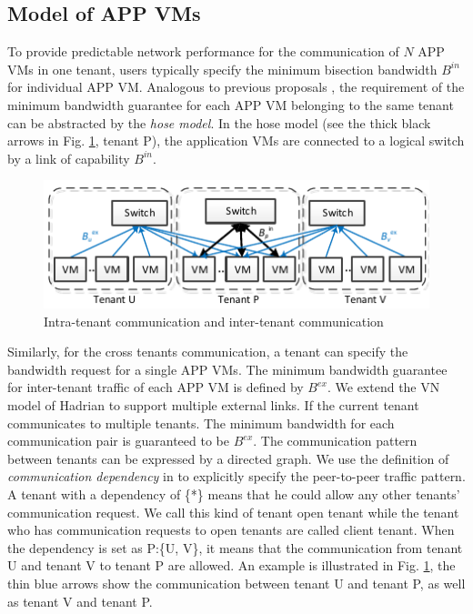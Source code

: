 \documentclass[10pt, conference, letterpaper]{IEEEtran}
\begin{document}
\subsection{Model of APP VMs}
To provide predictable network performance for the communication of $N$ APP VMs in one tenant, users typically specify the minimum bisection bandwidth $B^{in}$ for individual APP VM. Analogous to previous proposals \cite{B13cta, P12fst}, the requirement of the minimum bandwidth guarantee for each APP VM belonging to the same tenant can be abstracted by the \emph{hose model}. In the hose model (see the thick black arrows in Fig. \ref{fig:hose}, tenant P), the application VMs are connected to a logical switch by a link of capability $B^{in}$.

\begin{figure}
	\centering
		\includegraphics[width=3.5 in]{fig/tagmodel.pdf}
	\caption{Intra-tenant communication and inter-tenant communication}
	\label{fig:hose}
\end{figure}

Similarly, for the cross tenants communication, a tenant can specify the bandwidth request for a single APP VMs. The minimum bandwidth guarantee for inter-tenant traffic of each APP VM is defined by $B^{ex}$. We extend the VN model of Hadrian \cite{B13cta} to support multiple external links. If the current tenant communicates to multiple tenants. The minimum bandwidth for each communication pair is guaranteed to be $B^{ex}$. The communication pattern between tenants can be expressed by a directed graph. We use the definition of \emph{communication dependency} in \cite{B13cta} to explicitly specify the peer-to-peer traffic pattern. A tenant with a dependency of \{*\} means that he could allow any other tenants' communication request. We call this kind of tenant open tenant while the tenant who has communication requests to open tenants are called client tenant. When the dependency is set as P:\{U, V\}, it means that the communication from tenant U and tenant V to tenant P are allowed. An example is illustrated in Fig. \ref{fig:hose}, the thin blue arrows show the communication between tenant U and tenant P, as well as tenant V and tenant P.
\end{document}
